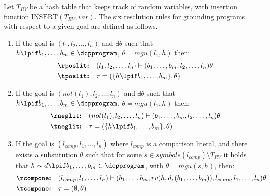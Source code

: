 \begin{definition}
	\label{def:resolution_rules}
	
	Let $T_{RV}$ be a hash table that keeps track of random variables, with insertion function $\mathrm{INSERT}(T_{RV},var)$. 
	The six resolution rules for grounding \dcproblogsty programs with respect to a given goal are defined as follows. 
	
	\begin{enumerate}
		\item[\cposlit] If the goal is $(l_1, l_2, \dots, l_n)$ and  $\exists \theta$ such that  $h \lpif b_1, \dots, b_m \in \dcpprogram$, $\theta  = mgu(l_1, h)$ then:
		\begin{align*}
			&{\text{\bf \rposlit:}} \quad (l_1, l_2, \dots, l_n) \vdash (b_1, \dots, b_m, l_2, \dots, l_n) \theta
			\\
			&{\text{\bf \tposlit:}} \quad \tau = (\{ h \lpif b_1, \dots, b_m \}, \theta)
		\end{align*}
		
		\item[\bf \cneglit]  If the goal is $(not(l_1), l_2, \dots, l_n)$ and  $\exists \theta$ such that  $h \lpif b_1, \dots, b_m \in \dcpprogram$, $\theta  {=} mgu(l_1, h)$ then:
		\begin{align*}
			&{\text{\bf \rneglit:}} \quad (not(l_1), l_2, \dots, l_n) \vdash (b_1, \dots, b_m, l_2, \dots, l_n) \theta
			\\
			&{\text{\bf \tneglit:}} \quad \tau = (\{ h \lpif b_1, \dots, b_m \}, \theta)
		\end{align*}
		
		\item[\ccompone]  If the goal is $( l_{comp}, l_1, \dots, l_n )$ where  $l_{comp}$ is a comparison literal, and  there exists a substitution $\theta$ such that for some $s \in symbols(l_{comp})\setminus T_{RV}$ it holds that $h\sim d\lpif b_1, \dots, b_m\in \dcpprogram$, with $\theta = mgu(s,h)$, then:
		\begin{align*}
			&{\text{\bf \rcompone:}} \quad ( l_{comp}, l_1, \dots, l_n ) \vdash (b_1, \dots, b_m, rv(h, d, (b_1, \dots, b_m)),  l_{comp}, l_1,\dots ,l_n)\theta
			\\
			&{\text{\bf \tcompone:}} \quad \tau = (\emptyset, \theta)
		\end{align*}
		

\end{enumerate}
\end{definition}
